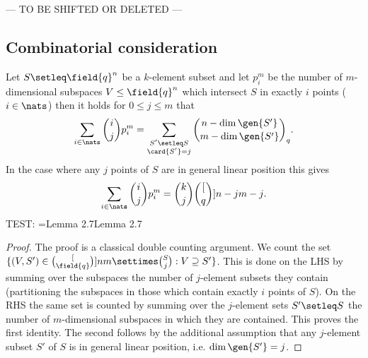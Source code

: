 
 --- TO BE SHIFTED OR DELETED ---
\subsection{Combinatorial consideration}
\begin{lemma}
  Let $S\setleq \field{q}^n$ be a $k$-element subset and let $p_i^m$ be the
  number of $m$-dimensional subspaces $V\leq \field{q}^n$ which
  intersect $S$ in exactly $i$ points
  ($i\in\nats$) then it holds for $0\leq j\leq m$ that
  $$
  \sum_{i\in\nats}{\binom{i}{j}p^m_i} = \sum_{\substack{S'\setleq S\\
          \card{S'}=j}}{\binom{n-\dim\gen{S'}}{m-\dim\gen{S'}}_q}\text{.}
  $$
  In the case where any $j$ points of $S$ are in general linear position this
  gives
  $$
  \sum_{i\in\nats}{\binom{i}{j}p^m_i}=\binom{k}{j}\binom[q]{n-j}{m-j}\text{.}
  $$
TEST:%
\makeatletter
\context@push\a%
\def\a{Lemma 2.7}
\newtoks\funtoks%
\funtoks={\a\a}
\newcount\funcount%
%
\context@diff\funtoks\funcount%
\the\t@context%
\makeatother
\end{lemma}

\begin{proof}
  The proof is a classical double counting argument. We count the set
  $\{(V,S')\in\binom[\field{q}]{n}{m}\settimes\binom{S}{j}:V\supseteq
  S'\}$. This is done on the LHS by summing over the subspaces the
  number of $j$-element subsets they contain (partitioning the subspaces
  in those which contain exactly $i$ points of $S$). On the RHS the same
  set is counted by summing over the $j$-element sets $S'\setleq S$
  the number of $m$-dimensional subspaces in which they are contained.
  This proves the first identity.
  The second follows by the additional assumption that any $j$-element
  subset $S'$ of $S$ is in general linear position, i.e. $\dim\gen{S'}=j$.
\end{proof}
